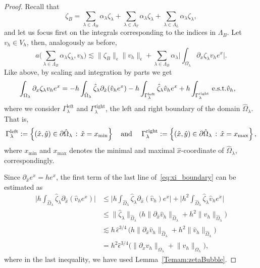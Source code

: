\documentclass[10pt,a4paper]{amsart}
\newcommand{\Gammaleft}{\ensuremath{\Gamma_\lambda^{\text{left}}}\xspace}
\newcommand{\Gammaright}{\ensuremath{\Gamma_\lambda^{\text{right}}}\xspace}
\newcommand{\est}{\text{\,e.s.t.}\xspace}
\newcommand{\summLA}[1][{}]{\ensuremath{\sum_{\lambda\in\Lambda_{#1}}\alpha_\lambda}}
\begin{document}
\begin{proof}
Recall that
\[\zeta_B = \summLA[B]\zeta_\lambda+ \summLA[T]\zeta_\lambda+
\summLA[L]\zeta_\lambda,\]
and let us focus first on the integrals corresponding to the indices in $\Lambda_B$. 
Let $v_h\in V_h$, then, analogously as before,
\begin{equation}\label{Eq:79}
a\big(\summLA[B]\zeta_\lambda,v_h\big)  \lesssim 
\big\|\zeta_B\big\|_\epsilon \big\|v_h\big\|_\epsilon + \summLA[B] \Big|\int_{\Omega_\lambda} \partial_x \zeta_\lambda v_h e^x\Big|.
\end{equation}
Like above, by scaling and integration by parts we get
\begin{equation}\label{eq:xi_boundary}
\begin{aligned}
   \int_{\Omega_\lambda} \partial_x \zeta_\lambda v_h e^x 
  &= -h\int_{\hat{\Omega}_\lambda} \hat{\zeta}_\lambda \partial_{\hat{x}}(\hat{v}_h e^x)
  - h\int_{\Gammaleft} \hat{\zeta}_\lambda \hat{v}_h e^x  + h\int_{\Gammaright} \text{\est } \hat{v}_h,
\end{aligned}
\end{equation}
where we consider $\Gammaleft$ and $\Gammaright$, the left and right boundary of the domain $\hat{\Omega}_\lambda$. That is,
\begin{equation*}
 \Gammaleft := \left\{ (\hat{x}, \hat{y}) \in \partial \hat{\Omega}_\lambda \,:\, \hat{x} = x_{\min} \right\}\text{\quad and \quad}
 \Gammaright := \left\{ (\hat{x}, \hat{y}) \in \partial \hat{\Omega}_\lambda \,:\, \hat{x} = x_{\max} \right\},
\end{equation*}
where $x_{\min}$ and $x_{\max}$ denotes the minimal and maximal $\hat{x}$-coordinate of $\hat{\Omega}_\lambda$, correspondingly.

Since $\partial_{\hat{x}} e^x = h e^x$, the first term of the last line of~\eqref{eq:xi_boundary} can be estimated as
\begin{equation}\label{Eq:77}
\begin{aligned}
\Big|h\int_{\hat{\Omega}_\lambda} \hat{\zeta}_\lambda \partial_{\hat{x}}(\hat{v}_h e^x)\Big|
 &\leq \Big|h\int_{{\hat{\Omega}_\lambda}} \hat{\zeta}_\lambda \partial_{\hat{x}}(\hat{v}_h) e^x\Big|
+ \Big|h^2\int_{\hat{\Omega}_\lambda} \hat{\zeta}_\lambda \hat{v}_h e^x\Big|
\\
&\le \|\hat{\zeta}_\lambda\|_{\hat{\Omega}_\lambda}
\big( h\big\|\partial_{\hat{x}} \hat{v}_h\big\|_{\hat{\Omega}_\lambda} +h^2 \big\| \hat{v}_h\big\|_{\hat{\Omega}_\lambda}\big)
\\
&\lesssim h \, \hat{\epsilon}^{3/4} \, \big(h\big\|\partial_{\hat{x}} \hat{v}_h\big\|_{\hat{\Omega}_\lambda} +h^2 \big\| \hat{v}_h\big\|_{\hat{\Omega}_\lambda}\big)
\\
&= h^2\hat{\epsilon}^{3/4} \big(\big\|\partial_x v_h\big\|_{\Omega_\lambda} +\big\|v_h\big\|_{\Omega_\lambda}\big),
\end{aligned}
\end{equation}
where in the last inequality, we have used Lemma~\ref{Temam:zetaBubble}.


\end{proof}
\end{document}
